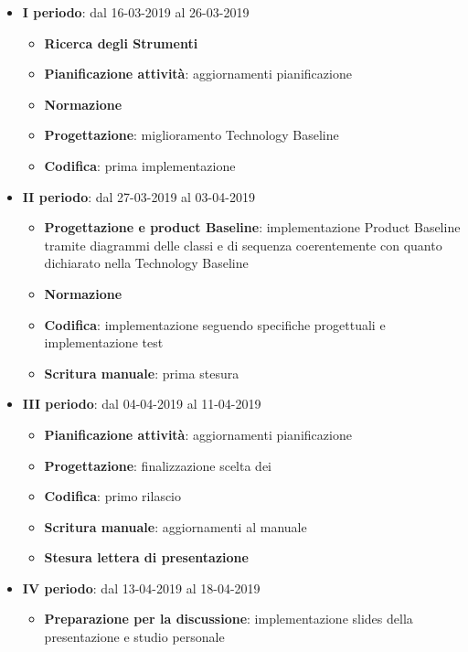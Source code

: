 		\begin{itemize}
			\item \textbf{I periodo}: dal 16-03-2019 al 26-03-2019
			\begin{itemize}
    	        \item \textbf{Ricerca degli Strumenti}
    	        \item \textbf{Pianificazione attività}: aggiornamenti pianificazione
    	        \item \textbf{Normazione}
    	        \item \textbf{Progettazione}: miglioramento Technology Baseline
    	        \item \textbf{Codifica}: prima implementazione
        	\end{itemize}
			\item \textbf{II periodo}: dal 27-03-2019 al 03-04-2019
			\begin{itemize}
				\item \textbf{Progettazione e product Baseline}: implementazione Product Baseline tramite diagrammi delle classi e di sequenza
				coerentemente con quanto dichiarato nella Technology Baseline
    	        \item \textbf{Normazione}
    	        \item \textbf{Codifica}: implementazione seguendo specifiche progettuali e implementazione test
    	        \item \textbf{Scritura manuale}: prima stesura
        	\end{itemize}
        	\item \textbf{III periodo}: dal 04-04-2019 al 11-04-2019
			\begin{itemize}
				\item \textbf{Pianificazione attività}: aggiornamenti pianificazione
    	        \item \textbf{Progettazione}: finalizzazione scelta dei 
    	        \item \textbf{Codifica}: primo rilascio
    	        \item \textbf{Scritura manuale}: aggiornamenti al manuale
    	        \item \textbf{Stesura lettera di presentazione}
        	\end{itemize}
        	\item \textbf{IV periodo}: dal 13-04-2019 al 18-04-2019
			\begin{itemize}
				\item \textbf{Preparazione per la discussione}: implementazione slides della presentazione e studio personale
        	\end{itemize}
        \end{itemize}
